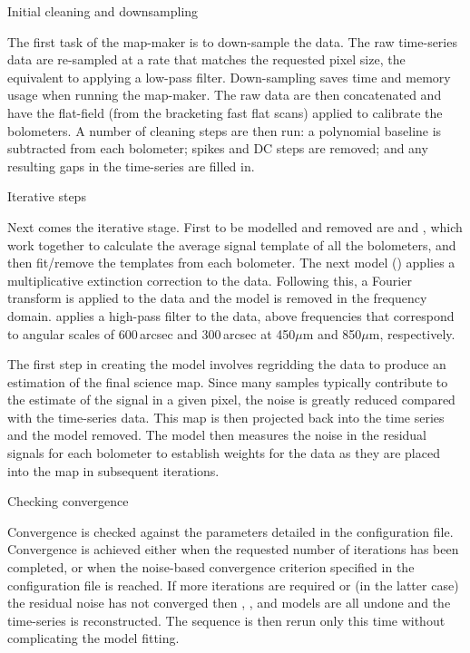 \documentclass[11pt,oneside,chapters]{starlink}
\begin{document}
\begin{enumdesc}
\item[Initial cleaning and downsampling]

The first task of the map-maker is to down-sample the data. The
raw time-series data are re-sampled at a rate that matches the
requested pixel size, the equivalent to applying a low-pass filter.
Down-sampling saves time and memory usage when running the map-maker.
The raw data are then concatenated and have the flat-field (from the
bracketing fast flat scans) applied to calibrate the bolometers. A
number of cleaning steps are then run: a polynomial baseline is
subtracted from each bolometer; spikes and DC steps are removed; and
any resulting gaps in the time-series are filled in.

\item[Iterative steps]

Next comes the iterative stage. First to be modelled
and removed are  and , which work together to
calculate the average signal template of all the bolometers, and then
fit/remove the templates from each bolometer. The next model
() applies a multiplicative extinction correction to the
data. Following this, a Fourier transform is applied to the data and
the  model is removed in the frequency domain.
 applies a high-pass filter to the data, above frequencies
that correspond to angular scales of 600\,arcsec and 300\,arcsec at
450$\mu$m and 850$\mu$m, respectively.


The first step in creating the   model involves
regridding the data to produce an estimation of the final science map.
Since many samples typically contribute to the estimate of the signal
in a given pixel, the noise is greatly reduced compared with the
time-series data. This map is then projected back into the time series
and the  model removed. The  model then
measures the noise in the residual signals for each bolometer to
establish weights for the data as they are placed into the map in
subsequent iterations.


\item[Checking convergence]

Convergence is checked against the parameters detailed
in the configuration file. Convergence is achieved either when the
requested number of iterations has been completed, or when the
noise-based convergence criterion specified in the configuration file
is reached. If more iterations are required or (in the latter case)
the residual noise has not converged then , ,
 and  models are all undone and the
time-series is reconstructed. The sequence is then rerun only this
time without  complicating the model fitting.
\end{enumdesc}
\end{document}
